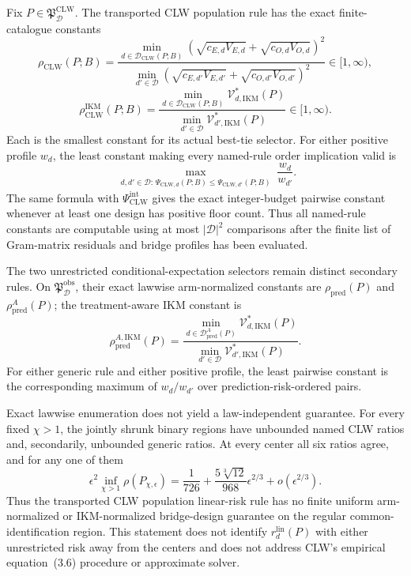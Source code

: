 Fix \(P\in\mathfrak P_{\mathcal D}^{\mathrm{CLW}}\).  The transported CLW population rule has the exact finite-catalogue constants
\[
 \rho_{\mathrm{CLW}}(P;B)
 =\frac{\min_{d\in\mathcal D_{\mathrm{CLW}}(P;B)}
 (\sqrt{c_{E,d}V_{E,d}}+\sqrt{c_{O,d}V_{O,d}})^2}
 {\min_{d'\in\mathcal D}
 (\sqrt{c_{E,d'}V_{E,d'}}+\sqrt{c_{O,d'}V_{O,d'}})^2}
 \in[1,\infty),                                           \tag{1}
\]
\[
 \rho_{\mathrm{CLW}}^{\mathrm{IKM}}(P;B)
 =\frac{\min_{d\in\mathcal D_{\mathrm{CLW}}(P;B)}
 \mathcal V_{d,\mathrm{IKM}}^*(P)}
 {\min_{d'\in\mathcal D}\mathcal V_{d',\mathrm{IKM}}^*(P)}
 \in[1,\infty).                                           \tag{2}
\]
Each is the smallest constant for its actual best-tie selector.  For either positive profile \(w_d\), the least constant making every named-rule order implication valid is
\[
 \max_{\substack{d,d'\in\mathcal D:\,
 \Psi_{\mathrm{CLW},d}(P;B)\le
 \Psi_{\mathrm{CLW},d'}(P;B)}}\frac{w_d}{w_{d'}}.         \tag{3}
\]
The same formula with \(\Psi_{\mathrm{CLW}}^{\mathrm{int}}\) gives the exact integer-budget pairwise constant whenever at least one design has positive floor count.  Thus all named-rule constants are computable using at most \(|\mathcal D|^2\) comparisons after the finite list of Gram-matrix residuals and bridge profiles has been evaluated.

The two unrestricted conditional-expectation selectors remain distinct secondary rules.  On \(\mathfrak P_{\mathcal D}^{\mathrm{obs}}\), their exact lawwise arm-normalized constants are \(\rho_{\mathrm{pred}}(P)\) and \(\rho_{\mathrm{pred}}^A(P)\); the treatment-aware IKM constant is
\[
 \rho_{\mathrm{pred}}^{A,\mathrm{IKM}}(P)=
 \frac{\min_{d\in\mathcal D_{\mathrm{pred}}^A(P)}
 \mathcal V_{d,\mathrm{IKM}}^*(P)}
 {\min_{d'\in\mathcal D}\mathcal V_{d',\mathrm{IKM}}^*(P)}. \tag{4}
\]
For either generic rule and either positive profile, the least pairwise constant is the corresponding maximum of \(w_d/w_{d'}\) over prediction-risk-ordered pairs.

Exact lawwise enumeration does not yield a law-independent guarantee.  For every fixed \(\chi>1\), the jointly shrunk binary regions have unbounded named CLW ratios and, secondarily, unbounded generic ratios.  At every center all six ratios agree, and for any one of them
\[
 \epsilon^2\inf_{\chi>1}\rho(P_{\chi,\epsilon})
 =\frac1{726}+\frac{5\sqrt[3]{12}}{968}\epsilon^{2/3}
 +o(\epsilon^{2/3}).                                      \tag{5}
\]
Thus the transported CLW population linear-risk rule has no finite uniform arm-normalized or IKM-normalized bridge-design guarantee on the regular common-identification region.  This statement does not identify \(r_d^{\mathrm{lin}}(P)\) with either unrestricted risk away from the centers and does not address CLW's empirical equation~(3.6) procedure or approximate solver.